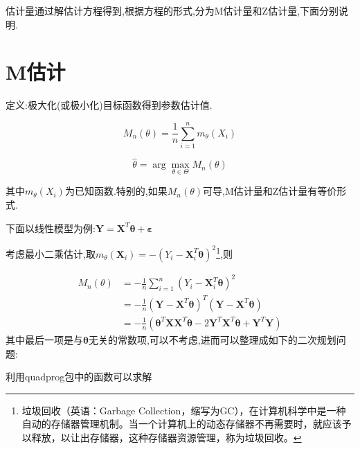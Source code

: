 \documentclass[]{ctexbook}
\begin{document}
估计量通过解估计方程得到,根据方程的形式,分为M估计量和Z估计量,下面分别说明.

\hypertarget{m}{%
\section{M估计}\label{m}}

定义:极大化(或极小化)目标函数得到参数估计值.

\[
M_{n}(\theta)=\frac{1}{n} \sum_{i=1}^{n} m_{\theta}\left(X_{i}\right)
\]

\[
\hat{\theta}=\arg \max_{\theta \in \Theta} M_{n}(\theta)
\]

其中\(m_{\theta}\left(X_{i}\right)\)为已知函数.特别的,如果\(M_n(\theta)\)可导,M估计量和Z估计量有等价形式.

下面以线性模型为例:\(\boldsymbol{Y}=\boldsymbol{X}^{T}\boldsymbol{\theta}+\boldsymbol{\varepsilon}\)

考虑最小二乘估计,取\(m_{\theta}\left(\boldsymbol{X}_{i}\right)=-\left(Y_{i}-\boldsymbol{X}_{i}^{T} \boldsymbol{\theta}\right)^{2}\)\footnote{垃圾回收（英语：Garbage Collection，缩写为GC），在计算机科学中是一种自动的存储器管理机制。当一个计算机上的动态存储器不再需要时，就应该予以释放，以让出存储器，这种存储器资源管理，称为垃圾回收。},则

\[ 
\begin{aligned} 
M_{n}(\theta)&=-\frac{1}{n} \sum_{i=1}^{n}\left(Y_{i}-\boldsymbol{X}_{i}^{T} \boldsymbol{\theta}\right)^{2}\\
&=-\frac{1}{n}\left(\boldsymbol{Y}-\boldsymbol{X}^{T} \boldsymbol{\theta}\right)^{T}\left(\boldsymbol{Y}-\boldsymbol{X}^{T} \boldsymbol{\theta}\right)\\
&=-\frac{1}{n}\left(\boldsymbol{\theta}^{T} \boldsymbol{X} \boldsymbol{X}^{T} \boldsymbol{\theta}-2 \boldsymbol{Y}^{T} \boldsymbol{X}^{T} \boldsymbol{\theta}+\boldsymbol{Y}^{T} \boldsymbol{Y}\right)
\end{aligned} 
\]
其中最后一项是与\(\boldsymbol{\theta}\)无关的常数项,可以不考虑,进而可以整理成如下的二次规划问题:

利用quadprog包中的函数可以求解
\end{document}
